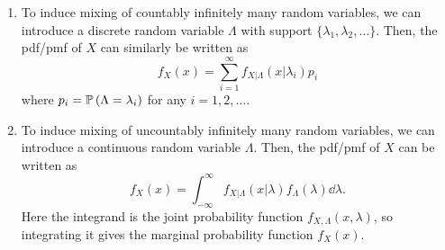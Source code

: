 \begin{enumerate}
For example, suppose that the pool of all policyholders can be classified into
several groups, say (i) good  policyholder and (ii) bad
 policyholder. Then, in this context, \(\Lambda\) can
represent the group indicator for the randomly selected policyholder.

For instance, we can let \(\Lambda=1\) for the good  group and \(\Lambda=0\)
for the bad  group. \begin{note}
The values assigned are not important.
\end{note}
Then \(\Lambda\) is a discrete random variable taking
values \(0\) or \(1\). The probability that \(\Lambda=1\) (\(\Lambda=0\)) can
be regarded as the ``proportion'' of good (bad) policyholders in the pool.

Then, we would like to model the losses for a good policyholder and a bad
policyholder using different distributions. This can be done by choosing
different distributions for \(X|\Lambda=1\) (distribution for good
policyholder) and \(X|\Lambda=0\) (distribution for bad policyholder).

\item \label{it:mixing-count-infinite}
To induce mixing of countably infinitely many random variables, we can
introduce a discrete random variable \(\Lambda\) with support
\(\{\lambda_1,\lambda_2,\dotsc\}\). Then, the pdf/pmf of \(X\) can similarly be
written as
\[
f_X(x)=\boxed{\sum_{i=1}^{\infty}f_{X|\Lambda}(x|\lambda_i)p_i}
\]
where \(p_i=\mathbb{P}\left(\Lambda=\lambda_i\right)\) for any \(i=1,2,\dotsc\).

\item \label{it:mixing-uncount-infinite}
To induce mixing of uncountably infinitely many random variables, we can
introduce a continuous random variable \(\Lambda\). Then, the pdf/pmf of \(X\)
can be written as
\[
f_X(x)=\boxed{\int_{-\infty}^{\infty}f_{X|\Lambda}(x|\lambda)f_{\Lambda}(\lambda)\dd{\lambda}}.
\]
Here the integrand is the joint probability function
\(f_{X,\Lambda}(x,\lambda)\), so integrating it gives the marginal probability
function \(f_X(x)\).

\end{enumerate}
